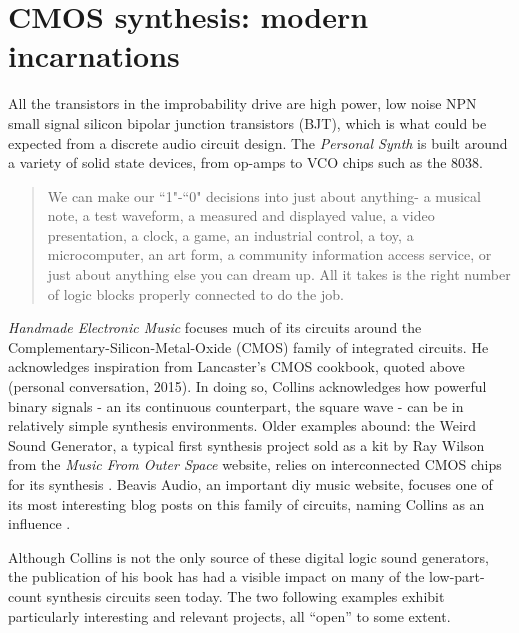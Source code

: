 

\section{CMOS synthesis: modern incarnations}

All the transistors in the improbability drive are high power, low noise NPN small signal silicon bipolar junction transistors (BJT), which is what could be expected from a discrete audio circuit design. The \emph{Personal Synth} is built around a variety of solid state devices, from op-amps to VCO chips such as the 8038. 

\begin{quote}
	
	We can make our ``1"-``0" decisions into just about anything- a musical note, a test waveform, a measured and displayed value, a video presentation, a clock, a game, an industrial control, a toy, a microcomputer, an art form, a community information access service, or just about anything else you can dream up. All it takes is the right number of logic blocks properly connected to do the job.
	\citep[pp-7-8]{lancaster1988}
	
\end{quote}

\emph{Handmade Electronic Music} focuses much of its circuits around the Complementary-Silicon-Metal-Oxide (CMOS) family of integrated circuits. He acknowledges inspiration from Lancaster's CMOS cookbook, quoted above (personal conversation, 2015). In doing so, Collins acknowledges how powerful binary signals - an its continuous counterpart, the square wave - can be in relatively simple synthesis environments. Older examples abound: the Weird Sound Generator, a typical first synthesis project sold as a kit by Ray Wilson from the \emph{Music From Outer Space} website, relies on interconnected CMOS chips for its synthesis \citep{wilson2015}. Beavis Audio, an important diy music website, focuses one of its most interesting blog posts on this family of circuits, naming Collins as an influence \citep{beavis2015}. 

Although Collins is not the only source of these digital logic sound generators, the publication of his book has had a visible impact on many of the low-part-count synthesis circuits seen today. The two following examples exhibit particularly interesting and relevant projects, all ``open'' to some extent. 

